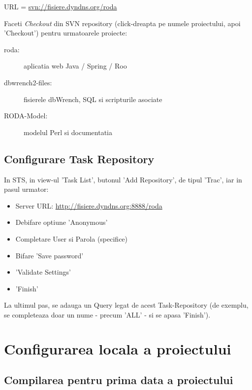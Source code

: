 URL = \url{svn://fisiere.dyndns.org/roda}

Faceti \emph{Checkout} din SVN repository (click-dreapta pe numele
proiectului, apoi 'Checkout') pentru urmatoarele proiecte:
\begin{description}
\item [roda:] aplicatia web Java / Spring / Roo
\item [dbwrench2-files:] fisierele dbWrench, SQL si scripturile asociate
\item [RODA-Model:] modelul Perl si documentatia
\end{description}

\begin{comment}
In STS, se face upgrade la Subversion 1.7 (pt. working copy) pentru fiecare din proiectele de mai sus: 
in perspectiva 'Spring', 
in view-ul 'Package Explorer' sau in view-ul 'Navigator', 
click-dreapta pe numele proiectului respectiv,
si apoi in meniul aparut:
'Team' -> 'Upgrade' -> 'OK'. 
Poate aparea un mesaj de eroare/warning, care indica
faptul ca working-copy local este deja conform versiunii 1.7 a SVN.
\end{comment}

\subsection{Configurare Task Repository}
In STS, in view-ul 'Task List', butonul 'Add Repository', de tipul 'Trac', 
iar in pasul urmator:
\begin{itemize}
\item 
Server URL:    \url{http://fisiere.dyndns.org:8888/roda}
\item
Debifare optiune 'Anonymous'
\item
Completare User si Parola (specifice)
\item
Bifare 'Save password'
\item
'Validate Settings'
\item
'Finish'
\end{itemize}

La ultimul pas, se adauga un Query legat de acest Task-Repository (de exemplu,
se completeaza doar un nume - precum 'ALL' - si se apasa 'Finish').

\section{Configurarea locala a proiectului}

\subsection{Compilarea pentru prima data a proiectului}

